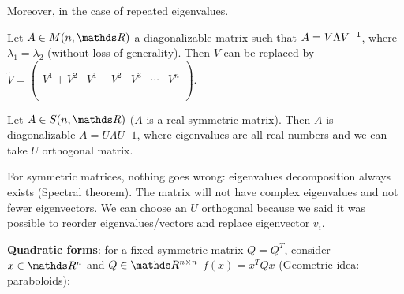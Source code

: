\documentclass[ComputationalMathematics.tex]{subfiles}
\begin{document}
Moreover, in the case of repeated eigenvalues.

\begin{proposition}
  Let $A \in M(n, \R)$ a diagonalizable matrix such that $A = V \Lambda {V}^{-1}$, where $\lambda_1 = \lambda_2$ (without loss of generality). Then $V$ can be replaced by $\widetilde{V} = \begin{pmatrix}
    \\
    \\
    V^1 + V^2 & V^1 - V^2 & V^3 & \cdots & V^n\\
    \\
    \\
  \end{pmatrix}$.
\end{proposition}

\begin{theorem}
  Let $A \in S(n, \R)$ ($A$ is a real symmetric matrix). Then $A$ is diagonalizable $A = U\Lambda U^-1$, where eigenvalues are all real numbers and we can take $U$ orthogonal matrix.
\end{theorem}


\noindent For symmetric matrices, nothing goes wrong: eigenvalues decomposition always exists (Spectral theorem). The matrix will not have complex eigenvalues and not fewer eigenvectors. We can choose an $U$ orthogonal because we said it was possible to reorder eigenvalues/vectors and replace eigenvector $v_i$. \\


\noindent \textbf{Quadratic forms}: for a fixed symmetric matrix $Q = Q^T$, consider $x \in \R^{n}$ and $Q \in \R^{n \times n}$ $f(x) = x^T Qx$ (Geometric idea: paraboloids):\\
\end{document}
